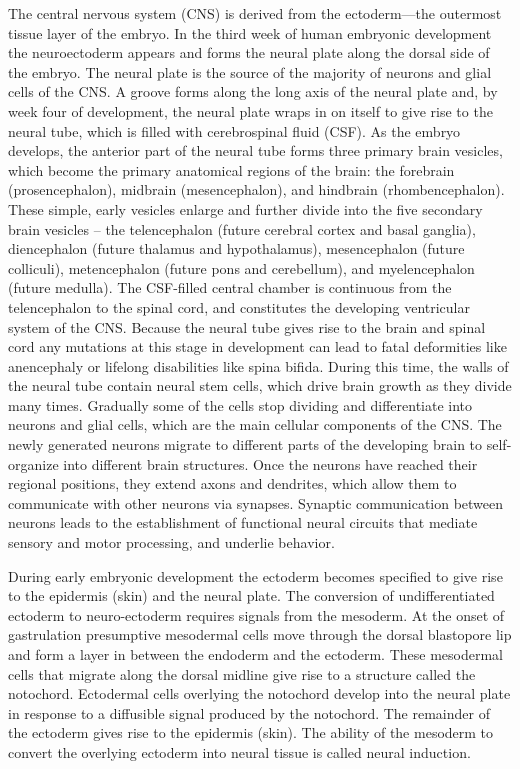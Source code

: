 The central nervous system (CNS) is derived from the ectoderm---the outermost tissue layer of the embryo. In the third week of human embryonic development the neuroectoderm appears and forms the neural plate along the dorsal side of the embryo. The neural plate is the source of the majority of neurons and glial cells of the CNS. A groove forms along the long axis of the neural plate and, by week four of development, the neural plate wraps in on itself to give rise to the neural tube, which is filled with cerebrospinal fluid (CSF). As the embryo develops, the anterior part of the neural tube forms three primary brain vesicles, which become the primary anatomical regions of the brain: the forebrain (prosencephalon), midbrain (mesencephalon), and hindbrain (rhombencephalon). These simple, early vesicles enlarge and further divide into the five secondary brain vesicles -- the telencephalon (future cerebral cortex and basal ganglia), diencephalon (future thalamus and hypothalamus), mesencephalon (future colliculi), metencephalon (future pons and cerebellum), and myelencephalon (future medulla). The CSF-filled central chamber is continuous from the telencephalon to the spinal cord, and constitutes the developing ventricular system of the CNS. Because the neural tube gives rise to the brain and spinal cord any mutations at this stage in development can lead to fatal deformities like anencephaly or lifelong disabilities like spina bifida. During this time, the walls of the neural tube contain neural stem cells, which drive brain growth as they divide many times. Gradually some of the cells stop dividing and differentiate into neurons and glial cells, which are the main cellular components of the CNS. The newly generated neurons migrate to different parts of the developing brain to self-organize into different brain structures. Once the neurons have reached their regional positions, they extend axons and dendrites, which allow them to communicate with other neurons via synapses. Synaptic communication between neurons leads to the establishment of functional neural circuits that mediate sensory and motor processing, and underlie behavior.

During early embryonic development the ectoderm becomes specified to give rise to the epidermis (skin) and the neural plate. The conversion of undifferentiated ectoderm to neuro-ectoderm requires signals from the mesoderm. At the onset of gastrulation presumptive mesodermal cells move through the dorsal blastopore lip and form a layer in between the endoderm and the ectoderm. These mesodermal cells that migrate along the dorsal midline give rise to a structure called the notochord. Ectodermal cells overlying the notochord develop into the neural plate in response to a diffusible signal produced by the notochord. The remainder of the ectoderm gives rise to the epidermis (skin). The ability of the mesoderm to convert the overlying ectoderm into neural tissue is called neural induction.

